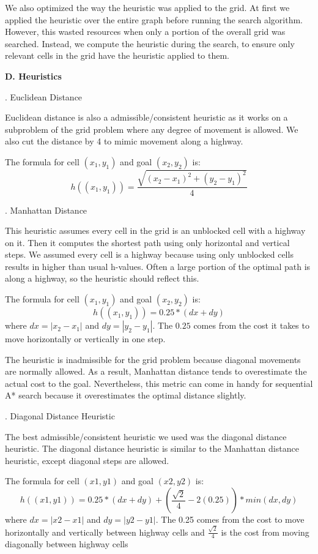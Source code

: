 \documentclass[12pt, letterpaper]{article}
\begin{document}
We also optimized the way the heuristic was applied to the grid. At first we applied the heuristic over the entire graph before running the search algorithm. However, this wasted resources when only a portion of the overall grid was searched. Instead, we compute the heuristic during the search, to ensure only relevant cells in the grid have the heuristic applied to them.

\pagebreak %

\noindent \textbf{D. Heuristics}

. Euclidean Distance

Euclidean distance is also a admissible/consistent heuristic as it works on a subproblem of the grid problem where any degree of movement is allowed. We also cut the distance by 4 to mimic movement along a highway.

The formula for cell $(x_1, y_1)$ and goal $(x_2, y_2)$ is:
$$h((x_1,y_1)) = \frac{\sqrt{(x_2-x_1)^2 + (y_2-y_1)^2}}{4}$$

\bigskip
{}. Manhattan Distance

This heuristic assumes every cell in the grid is an unblocked cell with a highway on it. Then it computes the shortest path using only horizontal and vertical steps. We assumed every cell is a highway because using only unblocked cells results in higher than usual h-values. Often a large portion of the optimal path is along a highway, so the heuristic should reflect this.

The formula for cell $(x_1, y_1)$ and goal $(x_2, y_2)$ is:
$$h((x_1, y_1)) = 0.25 * (dx + dy)$$
where $dx = |x_2 - x_1|$ and $dy = |y_2 - y_1|$. The $0.25$ comes from the cost it takes to move horizontally or vertically in one step.

The heuristic is inadmissible for the grid problem because diagonal movements are normally allowed. As a result, Manhattan distance tends to overestimate the actual cost to the goal. Nevertheless, this metric can come in handy for sequential A* search because it overestimates the optimal distance slightly.

\bigskip
{}. Diagonal Distance Heuristic

The best admissible/consistent heuristic we used was the diagonal distance heuristic. The diagonal distance heuristic is similar to the Manhattan distance heuristic, except diagonal steps are allowed. 

The formula for cell $(x1,y1)$ and goal $(x2, y2)$ is:
$$h((x1, y1)) = 0.25 * (dx + dy) +  (\frac{\sqrt{2}}{4} - 2(0.25)) * min(dx, dy)$$
where $dx = |x2 - x1|$ and $dy = |y2 - y1|$. The 0.25 comes from the cost to move horizontally and vertically between highway cells and $\frac{\sqrt{2}}{4}$ is the cost from moving diagonally between highway cells
\end{document}
